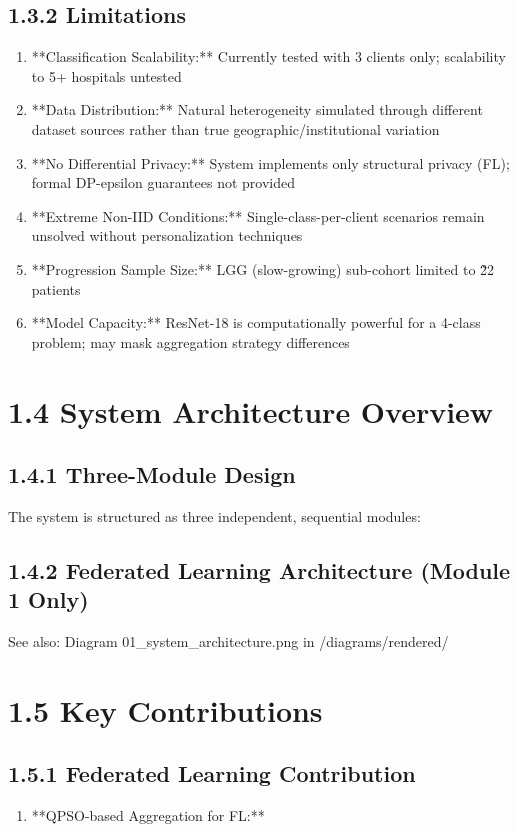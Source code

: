 \subsection{1.3.2 Limitations}
\begin{enumerate}
  \item **Classification Scalability:** Currently tested with 3 clients only; scalability to 5+ hospitals untested
  \item **Data Distribution:** Natural heterogeneity simulated through different dataset sources rather than true geographic/institutional variation
  \item **No Differential Privacy:** System implements only structural privacy (FL); formal DP-epsilon guarantees not provided
  \item **Extreme Non-IID Conditions:** Single-class-per-client scenarios remain unsolved without personalization techniques
  \item **Progression Sample Size:** LGG (slow-growing) sub-cohort limited to \~22 patients
  \item **Model Capacity:** ResNet-18 is computationally powerful for a 4-class problem; may mask aggregation strategy differences
\end{enumerate}


\section{1.4 System Architecture Overview}

\subsection{1.4.1 Three-Module Design}
The system is structured as three independent, sequential modules:


\subsection{1.4.2 Federated Learning Architecture (Module 1 Only)}
See also: Diagram 01\_system\_architecture.png in /diagrams/rendered/


\section{1.5 Key Contributions}

\subsection{1.5.1 Federated Learning Contribution}
\begin{enumerate}
  \item **QPSO-based Aggregation for FL:**
\end{enumerate}

